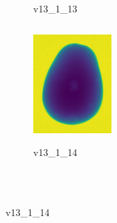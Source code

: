 \documentclass[11pt]{article}
\begin{document}
\begin{figure}
\begin{subfigure}[b]{0.15\textwidth}
        \caption{v13\_1\_13}
         \label{fig:five over x}
     \end{subfigure}
     \hfill
    \begin{subfigure}[b]{0.15\textwidth}
         \centering
         \includegraphics[width=3cm, height=4.5cm]{images/kartofler/v13_1_14_cut.png}
        \caption{v13\_1\_14}
         \label{fig:five over x}
     \end{subfigure}
     
     
     \\ \\
     

\end{figure}
\end{document}
